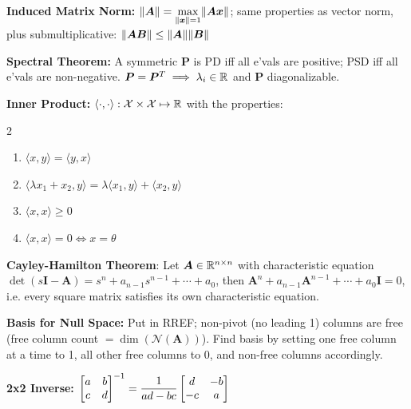 \documentclass[twocolumn, 8pt]{extarticle}
\begin{document}
\textbf{Induced Matrix Norm:} \(\displaystyle \lVert\bm A\rVert = \max _{\lVert\bm x\rVert = 1} \lVert\bm A\bm x\rVert\); same
properties as vector norm, plus submultiplicative: \(\lVert\bm A\bm B\rVert \leq \lVert\bm A\rVert\lVert\bm B\rVert\)

\textbf{Spectral Theorem:} A symmetric \(\bm P\) is PD iff all e'vals are positive; PSD iff all e'vals are non-negative.
\(\bm P = \bm P^T \implies \lambda _i \in \mathbb{R}\) and \(\bm P\) diagonalizable.

\textbf{Inner Product:} \(\langle\cdot, \cdot\rangle: \mathcal X \times \mathcal X \mapsto \mathbb{R}\) with the properties:
\vspace{-\baselineskip}
\begin{multicols}{2}
    \begin{enumerate}
        \item \(\langle x, y \rangle = \langle y, x \rangle\)
        \item \(\langle \lambda x_1 + x_2, y \rangle = \lambda\langle x_1, y \rangle + \langle x_2, y \rangle\)
        \item \(\langle x, x \rangle \geq 0\)
        \item \(\langle x, x \rangle = 0 \iff x = \theta\)
    \end{enumerate}
\end{multicols}
\vspace{-\baselineskip}

\textbf{Cayley-Hamilton Theorem}: Let \(\bm A \in \mathbb{R}^{n \times n}\) with characteristic equation \(\det(s\bm I - \bm
A) = s^n + a_{n - 1}s^{n - 1} + \cdots + a_0\), then \(\bm A^n + a_{n - 1}\bm A^{n - 1} + \cdots + a_0\bm I = 0\), i.e.
every square matrix satisfies its own characteristic equation.

\textbf{Basis for Null Space:} Put in RREF; non-pivot (no leading 1) columns are free (free column count
\(= \dim(\mathcal N(\bm A))\)). Find basis by setting one free column at a time to 1, all other free columns to 0, and
non-free columns accordingly.

\textbf{2x2 Inverse:} \(\displaystyle\begin{bmatrix} {a} & {b} \\ {c} & {d} \end{bmatrix}^{-1} = \frac{1}{ad - bc}\begin{bmatrix} {d} & {-b} \\ {-c} & {a} \end{bmatrix}\)
\end{document}
